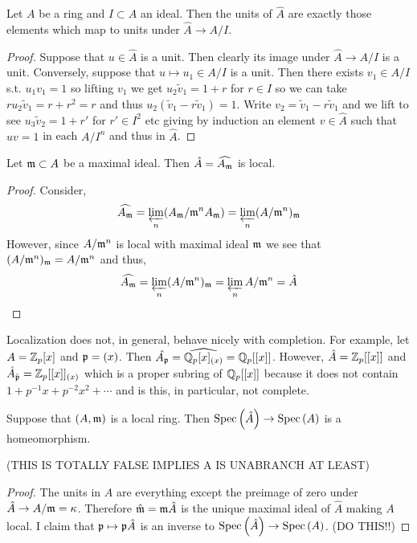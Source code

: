 \documentclass[12pt]{article}
\begin{document}
\begin{lemma}
Let $A$ be a ring and $I \subset A$ an ideal. Then the units of $\hat{A}$ are exactly those elements which map to units under $\hat{A} \to A / I$.
\end{lemma}

\begin{proof}
Suppose that $u \in \hat{A}$ is a unit. Then clearly its image under $\hat{A} \to A / I$ is a unit. Conversely, suppose that $u \mapsto u_1 \in A / I$ is a unit. Then there exists $v_1 \in A/I$ s.t. $u_1 v_1 = 1$ so lifting $v_1$ we get $u_2 \tilde{v}_1 = 1 + r$ for $r \in I$ so we can take $r u_2 \tilde{v}_1 = r + r^2 = r$ and thus $u_2 (\tilde{v}_1 - r \tilde{v}_1) = 1$. Write $v_2 = \tilde{v}_1 - r \tilde{v}_1$ and we lift to see $u_3 \tilde{v}_2 = 1 + r'$ for $r' \in I^2$ etc giving by induction an element $v \in \hat{A}$ such that $u v = 1$ in each $A / I^n$ and thus in $\hat{A}$.
\end{proof}

\begin{lemma}
Let $\mathfrak{m} \subset A$ be a maximal ideal. Then $\hat{A} = \widehat{A_{\mathfrak{m}}}$ is local.
\end{lemma}

\begin{proof}
Consider,
\[ \widehat{A_{\mathfrak{m}}} = \varprojlim_{n} (A_{\mathfrak{m}} / \mathfrak{m}^n A_{\mathfrak{m}}) = \varprojlim_{n} (A / \mathfrak{m}^n)_{\mathfrak{m}} \]
However, since $A / \mathfrak{m}^n$ is local with maximal ideal $\mathfrak{m}$ we see that $(A / \mathfrak{m}^n)_{\mathfrak{m}} = A / \mathfrak{m}^n$ and thus,
\[ \widehat{A_{\mathfrak{m}}} = \varprojlim_{n} (A / \mathfrak{m}^n)_{\mathfrak{m}} = \varprojlim_{n} A / \mathfrak{m}^n = \hat{A} \]
\end{proof}

\begin{rmk}
Localization does not, in general, behave nicely with completion. For example, let $A = \mathbb{Z}_p[x]$ and $\mathfrak{p} = (x)$. Then $\hat{A_{\mathfrak{p}}} = \widehat{\mathbb{Q}_p[x]_{(x)}} = \mathbb{Q}_p[[x]]$. However, $\hat{A} = \mathbb{Z}_p[[x]]$ and $\hat{A}_{\hat{\mathfrak{p}}} = \mathbb{Z}_p[[x]]_{(x)}$ which is a proper subring of $\mathbb{Q}_p[[x]]$ because it does not contain $1 + p^{-1} x + p^{-2} x^2 + \cdots$ and is this, in particular, not complete.
\end{rmk}

\begin{lemma}
Suppose that $(A, \mathfrak{m})$ is a local ring. Then $\mathrm{Spec}\left( \hat{A} \right) \to \mathrm{Spec}\left( A \right)$ is a homeomorphism.
\end{lemma}

(THIS IS TOTALLY FALSE IMPLIES A IS UNABRANCH AT LEAST)

\begin{proof}
The units in $\hat{A}$ are everything except the preimage of zero under $\hat{A} \to A / \mathfrak{m} = \kappa$. Therefore $\hat{\mathfrak{m}} = \mathfrak{m} \hat{A}$ is the unique maximal ideal of $\hat{A}$ making $A$ local. I claim that $\mathfrak{p} \mapsto \mathfrak{p} \hat{A}$ is an inverse to $\mathrm{Spec}\left( \hat{A} \right) \to \mathrm{Spec}\left( A \right)$. (DO THIS!!)
\end{proof}
\end{document}
